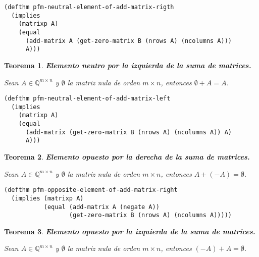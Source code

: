 \documentclass[a4paper,10pt]{article}
\newcommand{\M}[3]{#1 \in \mathbb{Q}^{#2 \times #3}}
\newtheorem{teor}{{Teorema}}
\begin{document}
\begin{lstlisting}[language=clips]
(defthm pfm-neutral-element-of-add-matrix-rigth
  (implies 
    (matrixp A)
    (equal 
      (add-matrix A (get-zero-matrix B (nrows A) (ncolumns A)))
      A)))
\end{lstlisting}

\par \vspace{16pt}

\begin{teor} \textbf{Elemento neutro por la izquierda de la suma de matrices.}\vspace{8pt}\par
Sean $\M{A}{m}{n}$ y $\emptyset$ la matriz nula de orden $m \times n$, entonces $\emptyset + A = A$.
\end{teor}

\begin{lstlisting}[language=clips]
(defthm pfm-neutral-element-of-add-matrix-left
  (implies 
    (matrixp A)
    (equal 
      (add-matrix (get-zero-matrix B (nrows A) (ncolumns A)) A)
      A)))
\end{lstlisting}

\par \vspace{16pt}

\begin{teor} \textbf{Elemento opuesto por la derecha de la suma de matrices.}\vspace{8pt}\par
Sean $\M{A}{m}{n}$ y $\emptyset$ la matriz nula de orden $m \times n$, entonces $A + (-A) = \emptyset$.
\end{teor}

\begin{lstlisting}[language=clips]
(defthm pfm-opposite-element-of-add-matrix-right
  (implies (matrixp A)
           (equal (add-matrix A (negate A))
                  (get-zero-matrix B (nrows A) (ncolumns A)))))
\end{lstlisting}
  
\par \vspace{16pt}

\begin{teor} \textbf{Elemento opuesto por la izquierda de la suma de matrices.}\vspace{8pt}\par
Sean $\M{A}{m}{n}$ y $\emptyset$ la matriz nula de orden $m \times n$, entonces $(-A) + A = \emptyset$.
\end{teor}
\end{document}
